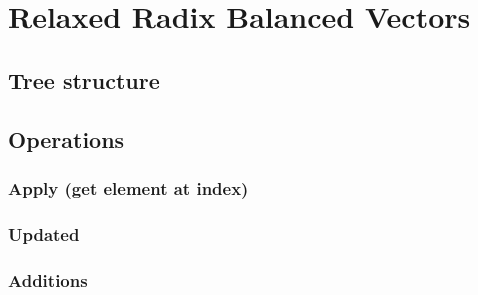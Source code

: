 
\section{Relaxed Radix Balanced Vectors}


\subsection{Tree structure}


\subsection{Operations}


\subsubsection{Apply (get element at index)}



\subsubsection{Updated}



\subsubsection{Additions}

